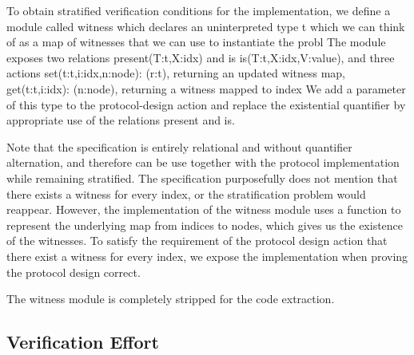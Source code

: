 {To obtain stratified verification conditions for the implementation, we define a module called witness which declares an uninterpreted type t which we can think of as a map of witnesses that we can use to instantiate the probl
The module exposes two relations present(T:t,X:idx) and is is(T:t,X:idx,V:value), and three actions set(t:t,i:idx,n:node): (r:t), returning an updated witness map, get(t:t,i:idx): (n:node), returning a witness mapped to index
We add a parameter of this type to the protocol-design action and replace the existential quantifier by appropriate use of the relations present and is.

Note that the specification is entirely relational and without quantifier alternation, and therefore can be use together with the protocol implementation while remaining stratified.
The specification purposefully does not mention that there exists a witness for every index, or the stratification problem would reappear.
However, the implementation of the witness module uses a function to represent the underlying map from indices to nodes, which gives us the existence of the witnesses.
To satisfy the requirement of the protocol design action that there exist a witness for every index, we expose the implementation when proving the protocol design correct.

The witness module is completely stripped for the code extraction.
}


\subsection{Verification Effort}


